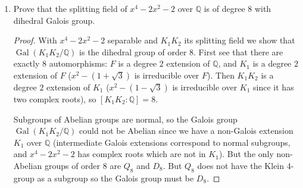 \documentclass[11pt]{article}
\DeclareMathOperator{\Gal}{Gal}
\DeclareMathOperator{\id}{id}
\begin{document}
\begin{enumerate}
\begin{enumerate}
\begin{proof}
            We write down generators for $\Gal(K_1K_2/F)$: \[\sigma\colon\begin{cases}
                \alpha_1\mapsto \alpha_1 \\
                \alpha_2\mapsto \alpha_4 = -\alpha_2
            \end{cases}\quad \tau\colon\begin{cases}
                \alpha_1\mapsto \alpha_3 = -\alpha_1\\
                \alpha_2\mapsto \alpha_2
            \end{cases}\quad \text{see also}\quad \sigma\tau\colon\begin{cases}
                \alpha_1\mapsto \alpha_3 = -\alpha_1 \\
                \alpha_2\mapsto \alpha_4 = -\alpha_2
            \end{cases}\] (.) Observe that $\sigma, \tau$, and $\sigma\tau$ have order $2$ so that $\Gal(K_1K_2/F) = \abr{\sigma,\tau\mid \sigma^2 = \tau^2 = (\sigma\tau)^2 = \id_{K_1K_2}}$ which is a presentation for the Klein $4$-group. The subgroups of the Galois group are copies of $Z_2$, given by $\abr{\sigma},\abr{\tau}$, and $\abr{\sigma\tau}$. As $\sigma$ fixes $\alpha_1$ it follows that $(K_1K_2)^{\abr{\sigma}} = K_1$ and similarly $\tau$ fixes $\alpha_2$ so that $(K_1K_2)^{\abr{\tau}} = K_2$. Observe that $\sigma\tau$ fixes $\alpha_1\alpha_2$ so that $(K_1K_2)^{\abr{\sigma\tau}} = F(\alpha_1\alpha_2)$. The trivial subgroup of course fixes $K_1K_2$ and the whole group fixes $F$ (recall $\alpha_1^2-1 = 1-\alpha_2^2 = \sqrt{3}$).
        \end{proof}
        \item Prove that the splitting field of $x^4-2x^2-2$ over $\mathbb{Q}$ is of degree $8$ with dihedral Galois group. \begin{proof}
            With $x^4-2x^2-2$ separable and $K_1K_2$ its splitting field we show that $\Gal(K_1K_2/\mathbb{Q})$ is the dihedral group of order $8$. First see that there are exactly $8$ automorphisms: $F$ is a degree $2$ extension of $\mathbb{Q}$, and $K_1$ is a degree $2$ extension of $F$ ($x^2-(1+\sqrt{3})$ is irreducible over $F$). Then $K_1K_2$ is a degree $2$ extension of $K_1$ ($x^2-(1-\sqrt{3})$ is irreducible over $K_1$ since it has two complex roots), so $[K_1K_2\colon \mathbb{Q}] = 8$.

            Subgroups of Abelian groups are normal, so the Galois group $\Gal(K_1K_2/\mathbb{Q})$ could not be Abelian since we have a non-Galois extension $K_1$ over $\mathbb{Q}$ (intermediate Galois extensions correspond to normal subgroups, and $x^4-2x^2-2$ has complex roots which are not in $K_1$). But the only non-Abelian groups of order $8$ are $Q_8$ and $D_8$. But $Q_8$ does not have the Klein $4$-group as a subgroup so the Galois group must be $D_8$.
        \end{proof}
    \end{enumerate}
\end{enumerate}
\end{document}
